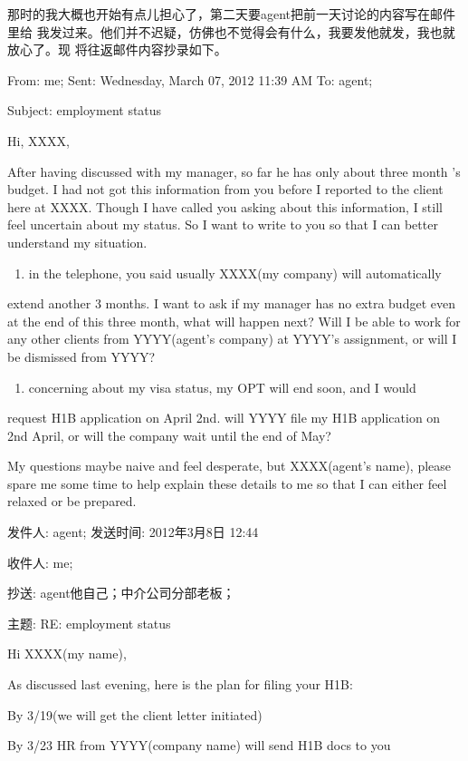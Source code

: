 \documentclass[12pt]{book}
\begin{document}
那时的我大概也开始有点儿担心了，第二天要agent把前一天讨论的内容写在邮件里给
我发过来。他们并不迟疑，仿佛也不觉得会有什么，我要发他就发，我也就放心了。现
将往返邮件内容抄录如下。

From: me; Sent: Wednesday, March 07, 2012 11:39 AM To: agent;

Subject: employment status

Hi, XXXX, 

After having discussed with my manager, so far he has only about three month
's budget. I had not got this information from you before I reported to the 
client here at XXXX. Though I have called you asking about this information,
I still feel uncertain about my status. So I want to write to you so that I
can better understand my situation. 

\begin{enumerate}
\item in the telephone, you said usually XXXX(my company) will automatically
\end{enumerate}
extend another 3 months. I want to ask if my manager has no extra budget 
even at the end of this three month, what will happen next? Will I be able 
to work for any other clients from YYYY(agent’s company) at YYYY's 
assignment, or will I be dismissed from YYYY?

\begin{enumerate}
\item concerning about my visa status, my OPT will end soon, and I would
\end{enumerate}
request H1B application on April 2nd. will YYYY file my H1B application on 
2nd April, or will the company wait until the end of May?

My questions maybe naive and feel desperate, but XXXX(agent’s name), please
spare me some time to help explain these details to me so that I can either
feel relaxed or be prepared. 

发件人: agent; 发送时间: 2012年3月8日 12:44

收件人: me;

抄送: agent他自己；中介公司分部老板；

主题: RE: employment status

Hi XXXX(my name),

As discussed last evening, here is the plan for filing your H1B:

By 3/19(we will get the client letter initiated)

By 3/23 HR from YYYY(company name) will send H1B docs to you 
\end{document}
